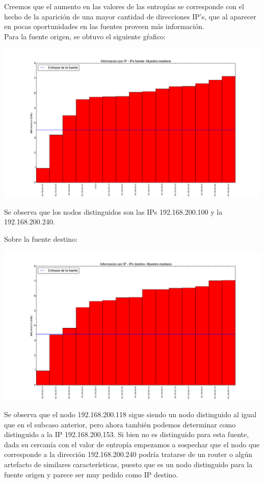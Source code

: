 \indent Creemos que el aumento en las valores de las entropías se corresponde con el hecho de la aparición de una mayor cantidad de direcciones IP's, que al aparecer en pocas oportunidades en las fuentes proveen más información.\\
\indent Para la fuente origen, se obtuvo el siguiente gŕafico:\\
\begin{center}
\includegraphics[scale=0.5,clip=true,trim=100 0 0 0]{graphics/laburo_mediana_src.png}
\end{center}

\indent Se observa que los nodos distinguidos son las IPs 192.168.200.100 y la 192.168.200.240.

\indent Sobre la fuente destino:\\
\begin{center}
\includegraphics[scale=0.5,clip=true,trim=100 0 0 0]{graphics/laburo_mediana_dst.png}
\end{center}

\indent  Se observa que el nodo 192.168.200.118 sigue siendo un nodo distinguido al igual que en el subcaso anterior, pero ahora también podemos determinar como distinguido a la IP 192.168.200.153. Si bien no es distinguido para esta fuente, dada su cercanía con el valor de entropía empezamos a sospechar que el nodo que corresponde a la dirección 192.168.200.240 podría tratarse de un router o algún artefacto de similares características, puesto que es un nodo distinguido para la fuente origen y parece ser muy pedido como IP destino.\\

